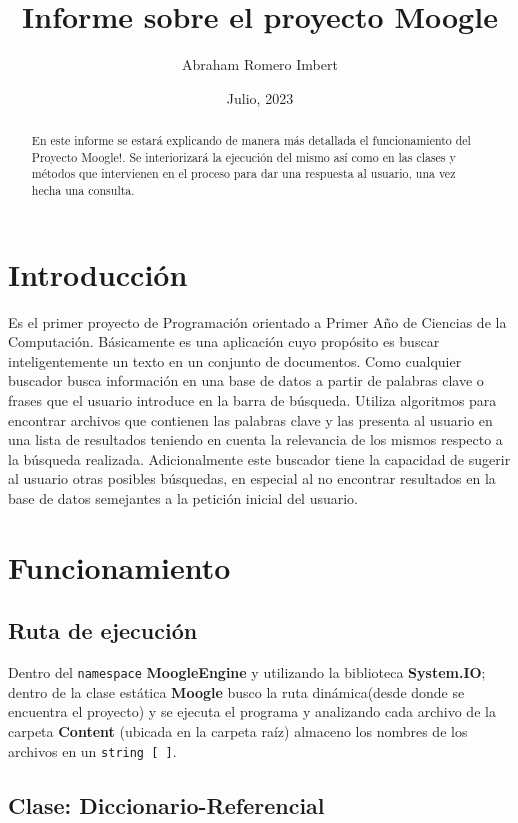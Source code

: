 \documentclass[a4paper,12pt]{article}
\begin{document}
\title{Informe sobre el proyecto Moogle}
\author{Abraham Romero Imbert}

\date{Julio, 2023}
\maketitle
\begin{abstract}
En este informe se estará explicando de manera más detallada el funcionamiento del Proyecto Moogle!. Se interiorizará la ejecución del mismo así como en las clases y métodos que intervienen en el proceso para dar una respuesta al usuario, una vez hecha una consulta.
\end{abstract}
\section{Introducción}\label{sec:intro}
Es el primer proyecto de Programación orientado a Primer Año de Ciencias de la Computación. Básicamente es una aplicación cuyo propósito es buscar inteligentemente un texto en un conjunto de documentos. Como cualquier buscador busca información en una base de datos a partir de palabras clave o frases que el usuario introduce en la barra de búsqueda. Utiliza algoritmos para encontrar archivos que contienen las palabras clave y las presenta al usuario en una lista de resultados teniendo en cuenta la relevancia de los mismos respecto a la búsqueda realizada. Adicionalmente este buscador tiene la capacidad de sugerir al usuario otras posibles búsquedas, en especial al no encontrar resultados en la base de datos semejantes a la petición inicial del usuario.

\section{Funcionamiento}

\subsection{Ruta de ejecución}\label{subsec:ejec-rut}

Dentro del \texttt{namespace} \textbf{MoogleEngine} y utilizando la biblioteca \textbf{System.IO}; dentro de la clase estática \textbf{Moogle} busco la ruta dinámica(desde donde se encuentra el proyecto) y se ejecuta el programa y analizando cada archivo de la carpeta \textbf{Content} (ubicada en la carpeta raíz) almaceno los nombres de los archivos en un \texttt{string [ ]}.

\subsection{Clase: \textbf{Diccionario-Referencial}}\label{subsec:dic-ref}
\end{document}
